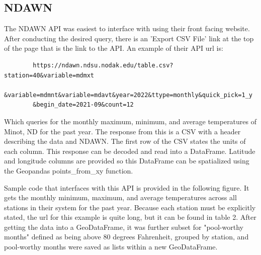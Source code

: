\documentclass[article,12pt]{article}
\numberwithin{equation}{section}
\begin{document}
\subsection*{NDAWN}

The NDAWN API was easiest to interface with using their front facing website. After conducting the desired query, there is an 'Export CSV File' link at the top of the page that is the link to the API. An example of their API url is:


	\small
	\begin{verbatim}
		https://ndawn.ndsu.nodak.edu/table.csv?station=40&variable=mdmxt
		&variable=mdmnt&variable=mdavt&year=2022&ttype=monthly&quick_pick=1_y
		&begin_date=2021-09&count=12
	\end{verbatim}

Which queries for the monthly maximum, minimum, and average temperatures of Minot, ND for the past year. The response from this is a CSV with a header describing the data and NDAWN. The first row of the CSV states the units of each column. This response can be decoded and read into a DataFrame. Latitude and longitude columns are provided so this DataFrame can be spatialized using the Geopandas points\_from\_xy function. 

Sample code that interfaces with this API is provided in the following figure. It gets the monthly minimum, maximum, and average temperatures across all stations in their system for the past year. Because each station must be explicitly stated, the url for this example is quite long, but it can be found in table 2. After getting the data into a GeoDataFrame, it was further subset for "pool-worthy months" defined as being above 80 degrees Fahrenheit, grouped by station, and pool-worthy months were saved as lists within a new GeoDataFrame.
\end{document}
